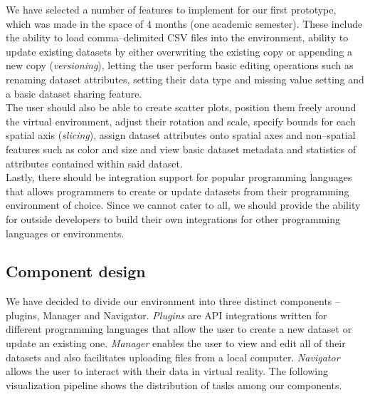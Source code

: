 \documentclass{article}
\begin{document}
We have selected a number of features to implement for our first prototype, which was made in the space of 4 months (one academic semester). These include the ability to load comma--delimited CSV files into the environment, ability to update existing datasets by either overwriting the existing copy or appending a new copy (\emph{versioning}), letting the user perform basic editing operations such as renaming dataset attributes, setting their data type and missing value setting and a basic dataset sharing feature.\\

The user should also be able to create scatter plots, position them freely around the virtual environment, adjust their rotation and scale, specify bounds for each spatial axis (\emph{slicing}), assign dataset attributes onto spatial axes and non--spatial features such as color and size and view basic dataset metadata and statistics of attributes contained within said dataset.\\

Lastly, there should be integration support for popular programming languages that allows programmers to create or update datasets from their programming environment of choice. Since we cannot cater to all, we should provide the ability for outside developers to build their own integrations for other programming languages or environments.

\subsection{Component design}

We have decided to divide our environment into three distinct components -- plugins, Manager and Navigator. \emph{Plugins} are API integrations written for different programming languages that allow the user to create a new dataset or update an existing one. \emph{Manager} enables the user to view and edit all of their datasets and also facilitates uploading files from a local computer. \emph{Navigator} allows the user to interact with their data in virtual reality. The following visualization pipeline shows the distribution of tasks among our components.\\
\end{document}

